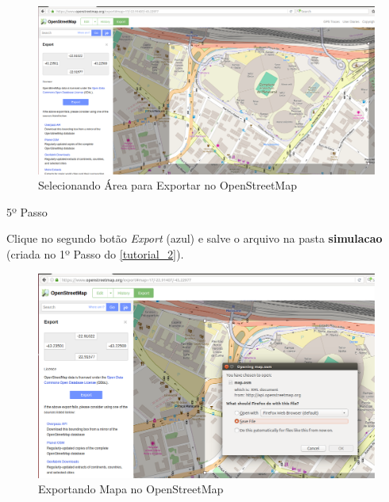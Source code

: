 \documentclass[
12pt,				%
openright,			%
oneside,			%
a4paper,			%
brazil,				%
]{abntex2}
\begin{document}
{\begin{anexosenv}
                \begin{figure} [H]
	                \centering
	                \includegraphics[scale=.28]{figuras/aneC/73SelecionandoArea}
	                \caption{\label{fig_73}Selecionando Área para Exportar no OpenStreetMap}
                \end{figure}
                    

            	\begin{description}
                    \item[5º Passo]
                \end{description}
                \par Clique no segundo botão \textit{Export} (azul) e salve o arquivo na pasta \textbf{simulacao} (criada no 1º Passo do \autoref{tutorial_2}). %
		            
                \begin{figure} [H]
	                \centering
	                \includegraphics[scale=.35]{figuras/aneC/74ExportandoMapa}
	                \caption{\label{fig_74}Exportando Mapa no OpenStreetMap}
                \end{figure}
                    

\end{anexosenv}}
\end{document}
